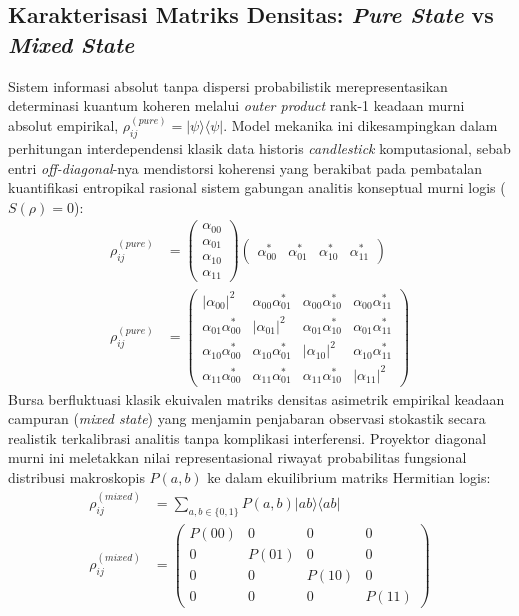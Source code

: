 \subsection{Karakterisasi Matriks Densitas: \emph{Pure State} vs \emph{Mixed State}}\label{konstruksi-matriks-densitas}
Sistem informasi absolut tanpa dispersi probabilistik merepresentasikan determinasi kuantum koheren melalui \emph{outer product} rank-1 keadaan murni absolut empirikal, $ \rho_{ij}^{(pure)} = |\psi\rangle\langle\psi| $. Model mekanika ini dikesampingkan dalam perhitungan interdependensi klasik data historis \emph{candlestick} komputasional, sebab entri \emph{off-diagonal}-nya mendistorsi koherensi yang berakibat pada pembatalan kuantifikasi entropikal rasional sistem gabungan analitis konseptual murni logis ($S(\rho)=0$):
\begin{align}
\rho_{ij}^{(pure)} &= \begin{pmatrix} \alpha_{00} \\ \alpha_{01} \\ \alpha_{10} \\ \alpha_{11} \end{pmatrix} \begin{pmatrix} \alpha_{00}^* & \alpha_{01}^* & \alpha_{10}^* & \alpha_{11}^* \end{pmatrix} \\
\rho_{ij}^{(pure)} &= \begin{pmatrix} |\alpha_{00}|^2 & \alpha_{00}\alpha_{01}^* & \alpha_{00}\alpha_{10}^* & \alpha_{00}\alpha_{11}^* \\ \alpha_{01}\alpha_{00}^* & |\alpha_{01}|^2 & \alpha_{01}\alpha_{10}^* & \alpha_{01}\alpha_{11}^* \\ \alpha_{10}\alpha_{00}^* & \alpha_{10}\alpha_{01}^* & |\alpha_{10}|^2 & \alpha_{10}\alpha_{11}^* \\ \alpha_{11}\alpha_{00}^* & \alpha_{11}\alpha_{01}^* & \alpha_{11}\alpha_{10}^* & |\alpha_{11}|^2 \end{pmatrix}
\end{align}
Bursa berfluktuasi klasik ekuivalen matriks densitas asimetrik empirikal keadaan campuran (\emph{mixed state}) yang menjamin penjabaran observasi stokastik secara realistik terkalibrasi analitis tanpa komplikasi interferensi. Proyektor diagonal murni ini meletakkan nilai representasional riwayat probabilitas fungsional distribusi makroskopis $P(a,b)$ ke dalam ekuilibrium matriks Hermitian logis:
\begin{align}
\rho_{ij}^{(mixed)} &= \sum_{a,b \in \{0,1\}} P(a,b) |ab\rangle\langle ab| \\
\rho_{ij}^{(mixed)} &= \begin{pmatrix} P(00) & 0 & 0 & 0 \\ 0 & P(01) & 0 & 0 \\ 0 & 0 & P(10) & 0 \\ 0 & 0 & 0 & P(11) \end{pmatrix}
\end{align}
